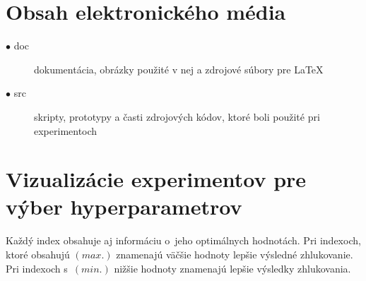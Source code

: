 \documentclass[a4paper,twoside,slovak,12pt,appendix]{article}
\begin{document}

\newpage


\newpage\null\thispagestyle{empty}\newpage


\begin{appendices}
\newpage
\section{Obsah elektronického média}

\begin{description}
  \item[$\bullet$ doc] dokumentácia, obrázky použité v nej a zdrojové súbory pre LaTeX
  \item[$\bullet$ src] skripty, prototypy a časti zdrojových kódov, ktoré boli použité pri experimentoch
\end{description}


\newpage
\section{Vizualizácie experimentov pre výber hyperparametrov}
\label{c:clustering-hyperparameters-experiments}
Každý index obsahuje aj informáciu o~jeho optimálnych hodnotách. Pri indexoch,
ktoré obsahujú $(max.)$ znamenajú väčšie hodnoty lepšie výsledné zhlukovanie.
Pri indexoch s~$(min.)$ nižšie hodnoty znamenajú lepšie výsledky zhlukovania.


\end{appendices}
\end{document}
